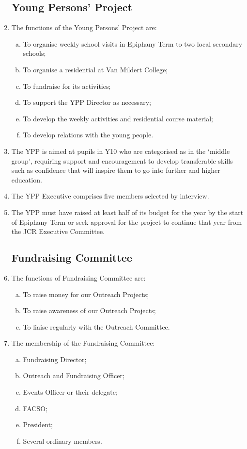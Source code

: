\documentclass[12pt]{article}
\begin{document}
\begin{enumerate}
    \subsection{Young Persons’ Project}
    \item The functions of the Young Persons’ Project are:
    \begin{enumerate}[(a)]
        \item To organise weekly school visits in Epiphany Term to two local secondary schools;
        \item To organise a residential at Van Mildert College;
        \item To fundraise for its activities;
        \item To support the YPP Director as necessary;
        \item To develop the weekly activities and residential course material;
        \item To develop relations with the young people.
    \end{enumerate}
    \item The YPP is aimed at pupils in Y10 who are categorised as in the ‘middle group’, requiring support and encouragement to develop transferable skills such as confidence that will inspire them to go into further and higher education.
    \item The YPP Executive comprises five members selected by interview.
    \item The YPP must have raised at least half of its budget for the year by the start of Epiphany Term or seek approval for the project to continue that year from the JCR Executive Committee.
    \subsection{Fundraising Committee}
    \item The functions of Fundraising Committee are:
    \begin{enumerate}[(a)]
        \item To raise money for our Outreach Projects;
        \item To raise awareness of our Outreach Projects;
        \item To liaise regularly with the Outreach Committee.
    \end{enumerate}
    \item The membership of the Fundraising Committee:
    \begin{enumerate}[(a)]
        \item Fundraising Director;
        \item Outreach and Fundraising Officer;
        \item Events Officer or their delegate;
        \item FACSO;
        \item President;
        \item Several ordinary members.
    \end{enumerate}


\end{enumerate}
\end{document}
